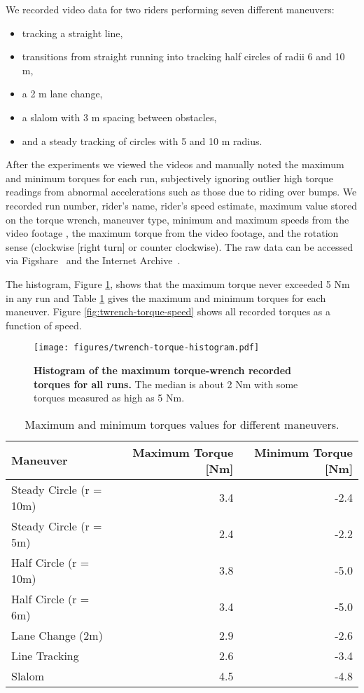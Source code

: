 \documentclass[10pt]{article}
\begin{document}
We recorded video data for two riders performing seven different maneuvers:

\begin{itemize}
  \item tracking a straight line,
  \item transitions from straight running into tracking half circles of radii 6 and 10
    m,
  \item a 2 m lane change,
  \item a slalom with 3 m spacing between obstacles,
  \item and a steady tracking of circles with 5 and 10 m radius.
\end{itemize}

After the experiments we viewed the videos and manually noted the
maximum and minimum torques for each run, subjectively ignoring outlier high
torque readings from abnormal accelerations such as those due to riding over
bumps. We recorded run number, rider's name, rider's speed estimate, maximum value stored on the torque wrench,
maneuver type, minimum and maximum speeds from the video
footage , the maximum torque from the video footage, and the
rotation sense (clockwise [right turn] or counter
clockwise). The raw data can be accessed via Figshare~\cite{}
and the Internet Archive~\cite{}.

The histogram, Figure \ref{fig:twrench-torque-histogram}, shows that the
maximum torque never exceeded 5 Nm in any run and Table
\ref{tab:maneuver-torque-values} gives the maximum and minimum torques for each
maneuver. Figure \ref{fig:twrench-torque-speed} shows all recorded
torques as a function of speed. 

\begin{figure}
  \centering
  \texttt{[image: figures/twrench-torque-histogram.pdf]}
  \caption{{\bf Histogram of the maximum torque-wrench recorded torques for all runs.}
    The median is about 2 Nm with some torques measured as high as 5 Nm. }
  \label{fig:twrench-torque-histogram}
\end{figure}

\begin{table}
  \caption{Maximum and minimum torques values for different maneuvers.}
  \begin{tabular}{lrr}
    \toprule
    Maneuver & Maximum Torque [Nm] & Minimum Torque [Nm] \\
    \midrule
    Steady Circle (r = 10m) & 3.4 & -2.4 \\
    Steady Circle (r = 5m) & 2.4 & -2.2 \\
    Half Circle (r = 10m) & 3.8 & -5.0 \\
    Half Circle (r = 6m) & 3.4 & -5.0 \\
    Lane Change (2m) & 2.9 & -2.6 \\
    Line Tracking & 2.6 & -3.4 \\
    Slalom & 4.5 & -4.8 \\
    \bottomrule
  \end{tabular}
  \label{tab:maneuver-torque-values}
\end{table}
\end{document}
